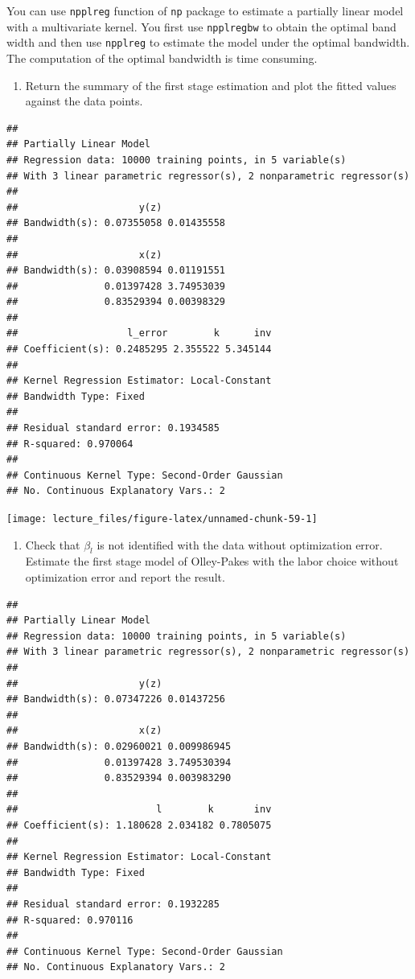 \documentclass[
]{book}
\providecommand{\tightlist}{%
  \setlength{\itemsep}{0pt}\setlength{\parskip}{0pt}}
\begin{document}
You can use \texttt{npplreg} function of \texttt{np} package to estimate a partially linear model with a multivariate kernel. You first use \texttt{npplregbw} to obtain the optimal band width and then use \texttt{npplreg} to estimate the model under the optimal bandwidth. The computation of the optimal bandwidth is time consuming.

\begin{enumerate}
\def\labelenumi{\arabic{enumi}.}
\setcounter{enumi}{2}
\tightlist
\item
  Return the summary of the first stage estimation and plot the fitted values against the data points.
\end{enumerate}

\begin{verbatim}
## 
## Partially Linear Model
## Regression data: 10000 training points, in 5 variable(s)
## With 3 linear parametric regressor(s), 2 nonparametric regressor(s)
## 
##                     y(z)           
## Bandwidth(s): 0.07355058 0.01435558
## 
##                     x(z)           
## Bandwidth(s): 0.03908594 0.01191551
##               0.01397428 3.74953039
##               0.83529394 0.00398329
## 
##                   l_error        k      inv
## Coefficient(s): 0.2485295 2.355522 5.345144
## 
## Kernel Regression Estimator: Local-Constant
## Bandwidth Type: Fixed
## 
## Residual standard error: 0.1934585
## R-squared: 0.970064
## 
## Continuous Kernel Type: Second-Order Gaussian
## No. Continuous Explanatory Vars.: 2
\end{verbatim}

\begin{center}\texttt{[image: lecture\_files/figure-latex/unnamed-chunk-59-1]} \end{center}

\begin{enumerate}
\def\labelenumi{\arabic{enumi}.}
\setcounter{enumi}{3}
\tightlist
\item
  Check that \(\beta_l\) is not identified with the data without optimization error. Estimate the first stage model of Olley-Pakes with the labor choice without optimization error and report the result.
\end{enumerate}

\begin{verbatim}
## 
## Partially Linear Model
## Regression data: 10000 training points, in 5 variable(s)
## With 3 linear parametric regressor(s), 2 nonparametric regressor(s)
## 
##                     y(z)           
## Bandwidth(s): 0.07347226 0.01437256
## 
##                     x(z)            
## Bandwidth(s): 0.02960021 0.009986945
##               0.01397428 3.749530394
##               0.83529394 0.003983290
## 
##                        l        k       inv
## Coefficient(s): 1.180628 2.034182 0.7805075
## 
## Kernel Regression Estimator: Local-Constant
## Bandwidth Type: Fixed
## 
## Residual standard error: 0.1932285
## R-squared: 0.970116
## 
## Continuous Kernel Type: Second-Order Gaussian
## No. Continuous Explanatory Vars.: 2
\end{verbatim}
\end{document}
